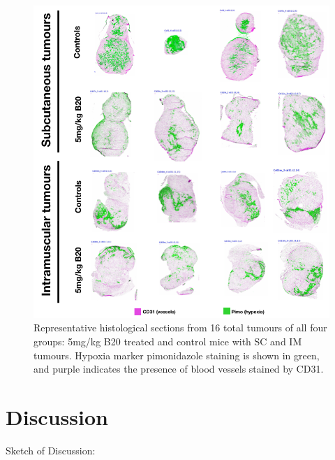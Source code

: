 \documentclass[num-refs]{wiley-article}
\begin{document}
\begin{figure}[htbp]
   \centering
   \includegraphics[width=\textwidth]{images/5_oep8_imsc_histo.png} %
   \caption{Representative histological sections from 16 total tumours of all four groups: 5mg/kg B20 treated and control mice with SC and IM tumours.
   Hypoxia marker pimonidazole staining is shown in green, and purple indicates the presence of blood vessels stained by CD31.}
   \label{allHisto}
\end{figure}

\newpage

\section{Discussion}
Sketch of Discussion:
\end{document}
